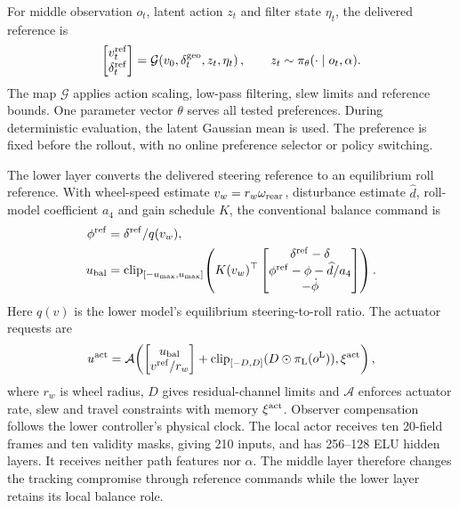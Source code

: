 \documentclass[final,5p,times,twocolumn]{elsarticle}
\begin{document}
For middle observation $o_t$, latent action $z_t$ and filter state $\eta_t$, the delivered reference is
\begin{equation}
\begin{bmatrix}v_t^{\rm ref}\\\delta_t^{\rm ref}\end{bmatrix}
=\mathcal G\!\left(v_0,\delta_t^{\rm geo},z_t,\eta_t\right),
\qquad z_t\sim\pi_\theta(\cdot\mid o_t,\alpha).
\label{eq:interface}
\end{equation}
The map $\mathcal G$ applies action scaling, low-pass filtering, slew limits and reference bounds. One parameter vector $\theta$ serves all tested preferences. During deterministic evaluation, the latent Gaussian mean is used. The preference is fixed before the rollout, with no online preference selector or policy switching.

The lower layer converts the delivered steering reference to an equilibrium roll reference. With wheel-speed estimate $v_w=r_w\omega_{\rm rear}$, disturbance estimate $\widehat d$, roll-model coefficient $a_4$ and gain schedule $K$, the conventional balance command is
\begin{equation}
\begin{split}
 \phi^{\rm ref}&=\delta^{\rm ref}/q(v_w),\\
 u_{\rm bal}&=\operatorname{clip}_{[-u_{\max},u_{\max}]}\!\left(
 K(v_w)^\top
 \begin{bmatrix}\delta^{\rm ref}-\delta\\
 \phi^{\rm ref}-\phi-\widehat d/a_4\\-\dot\phi\end{bmatrix}\right).
\end{split}
\label{eq:lowerbalance}
\end{equation}
Here $q(v)$ is the lower model's equilibrium steering-to-roll ratio. The actuator requests are
\begin{equation}
 u^{\rm act}=\mathcal A\!\left(
 \begin{bmatrix}u_{\rm bal}\\v^{\rm ref}/r_w\end{bmatrix}
 +\operatorname{clip}_{[-D,D]}(D\odot\pi_{\rm L}(o^{\rm L})),\xi^{\rm act}\right),
\label{eq:lowerresidual}
\end{equation}
where $r_w$ is wheel radius, $D$ gives residual-channel limits and $\mathcal A$ enforces actuator rate, slew and travel constraints with memory $\xi^{\rm act}$. Observer compensation follows the lower controller's physical clock. The local actor receives ten 20-field frames and ten validity masks, giving 210 inputs, and has 256--128 ELU hidden layers. It receives neither path features nor $\alpha$. The middle layer therefore changes the tracking compromise through reference commands while the lower layer retains its local balance role.
\end{document}
